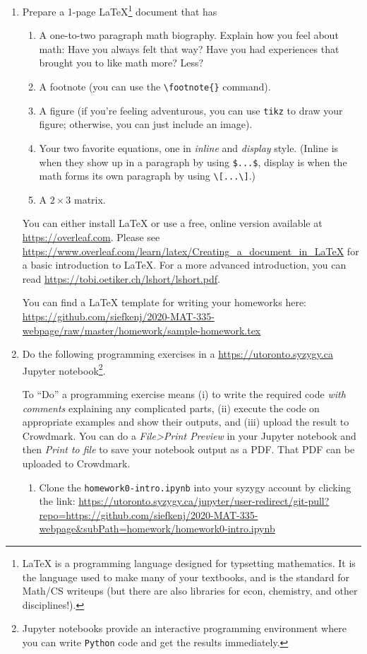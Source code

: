 \documentclass[letter]{article}
\begin{document}
	\begin{enumerate}
		\item Prepare a 1-page \LaTeX{}\footnote{ \LaTeX{} is a programming language designed for typsetting
			mathematics. It is the language used to make many of your textbooks, and is the standard for
			Math/CS writeups (but there are also libraries for econ, chemistry, and other disciplines!).} document that has
		\begin{enumerate}
			\item A one-to-two paragraph math biography. Explain how you feel about math: Have you always felt that way?
				Have you had experiences that brought you to like math more? Less?
			\item A footnote (you can use the \verb|\footnote{}| command).
			\item A figure (if you're feeling adventurous, you can use {\tt tikz} to draw your figure; otherwise,
				you can just include an image).
			\item Your two favorite equations, one in \emph{inline} and \emph{display} style. (Inline is when
				they show up in a paragraph by using \verb|$...$|, display is when the math forms
				its own paragraph by using \verb|\[...\]|.)
			\item A $2\times 3$ matrix.
		\end{enumerate}

		You can either install \LaTeX{} or use a free, online version available at \url{https://overleaf.com}. Please
		see \url{https://www.overleaf.com/learn/latex/Creating_a_document_in_LaTeX} for a basic introduction to \LaTeX{}.
		For a more advanced introduction, you can read \url{https://tobi.oetiker.ch/lshort/lshort.pdf}.

		You can find a \LaTeX{} template for writing your homeworks here: 
		\url{https://github.com/siefkenj/2020-MAT-335-webpage/raw/master/homework/sample-homework.tex}



		\item Do the following programming exercises in a \url{https://utoronto.syzygy.ca} Jupyter notebook\footnote{ Jupyter
			notebooks provide an interactive programming environment where you can write {\tt Python} code and get 
			the results immediately.}.

			To ``Do'' a programming exercise means (i) to write the required code \emph{with comments} explaining
			any complicated parts, (ii) execute the code on appropriate examples and show their outputs, and 
			(iii) upload the result to Crowdmark. You can do a {\it File>Print Preview} in your Jupyter notebook
			and then {\it Print to file} to save your notebook output as a PDF. That PDF can be uploaded to Crowdmark.
		\begin{enumerate}
			\item Clone the {\tt homework0-intro.ipynb} into your syzygy account by clicking the link:
				\url{https://utoronto.syzygy.ca/jupyter/user-redirect/git-pull?repo=https://github.com/siefkenj/2020-MAT-335-webpage&subPath=homework/homework0-intro.ipynb}


\end{enumerate}
\end{enumerate}
\end{document}

